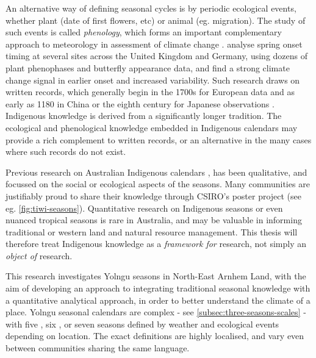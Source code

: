 An alternative way of defining seasonal cycles is by periodic ecological
events, whether plant (date of first flowers, etc) or animal (eg. migration).
The study of such events is called \textit{phenology}, which forms an
important complementary approach to meteorology in assessment of climate
change \citep[eg.][]{roy2000}.  \citet{menzel2006} analyse spring onset timing
at several sites across the United Kingdom and Germany, using dozens of
plant phenophases and butterfly appearance data, and find a strong climate
change signal in earlier onset and increased variability.  Such research
draws on written records, which generally begin in the 1700s for European
data and as early as 1180 in China \citep[][p97]{yoshino1996} or the eighth century
for Japanese observations \citep{sparks2002}.
%
Indigenous knowledge is derived from a significantly longer
tradition.  The ecological and phenological knowledge embedded
in Indigenous calendars may provide a rich complement to written records,
or an alternative in the many cases where such records do not exist.



Previous research on Australian Indigenous calendars ,
\citep{CSIROcals,clarke2009,davis1989,atlas2014}
has been qualitative, and focussed on the social or ecological aspects of
the seasons.  Many communities are justifiably proud to share
their knowledge through CSIRO's poster project (see eg. \cref{fig:tiwi-seasons}).
Quantitative research on Indigenous seasons or even nuanced tropical seasons
is rare in Australia, and may be valuable in informing traditional or western
land and natural resource management.  This thesis will therefore treat
Indigenous knowledge as a \emph{framework for} research, not simply an
\emph{object of} research.


This research investigates Yolngu seasons in North-East Arnhem Land, with the
aim of developing an approach to integrating traditional seasonal knowledge
with a quantitative analytical approach, in order to better understand the climate
of a place.  Yolngu seasonal calendars are complex - see
\cref{subsec:three-seasons-scales} - with five \citep{davis1989}, six
\citep{atlas2014}, or seven \citep{barber2005} seasons defined by weather and
ecological events depending on location.  The exact definitions are highly localised,
and vary even between communities sharing the same language.

